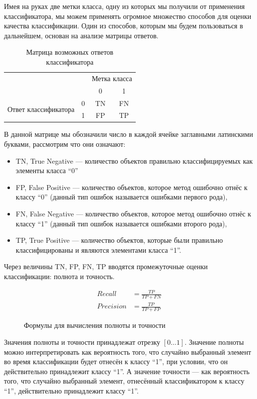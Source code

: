 Имея на руках две метки класса, одну из которых мы получили от применения классификатора, мы можем применять огромное множество способов для оценки качества классификации. Один из способов, которым мы будем пользоваться в дальнейшем, основан на анализе матрицы ответов.

\begin{table}[ht]
\caption{Матрица возможных ответов классификатора}
\label{tab_weight}
\centering
    \begin{tabular}{|c|c|c|c|}
    \hline \multicolumn{2}{|c|}{} & \multicolumn{2}{c|}{Метка класса} \\
    \cline {2-4} & & 0 & 1 \\
   	\hline \multirow{2}{*}{Ответ классификатора} &  0 & TN & FN \\
   	\cline {2-4} & 1 & FP & TP \\
    \hline
    \end{tabular}
\end{table}


В данной матрице мы обозначили число в каждой ячейке заглавными латинскими буквами, рассмотрим что они означают:
\begin{itemize}
\item  TN, True Negative — количество объектов правильно классифицируемых как элементы класса “0”
\item  FP, False Positive — количество объектов, которое метод ошибочно отнёс к классу “0” (данный тип ошибок называется ошибками первого рода),
\item  FN, False Negative — количество объектов, которое метод ошибочно отнёс к классу “1” (данный тип ошибок называется ошибками второго рода),
\item  TP, True Positive — количество объектов, которые были правильно классифицированы и являются элементами класса “1”.
\end{itemize}
Через величины TN, FP, FN, TP вводятся промежуточные оценки классификации: полнота и точность.

\begin{figure}[ht]
\begin{align}
Recall &= \frac{TP}{TP + FN} \\[0.5cm]
Precision &= \frac{TP}{TP + FP}
\end{align}
\caption{Формулы для вычисления полноты и точности}
\end{figure}

Значения полноты и точности принадлежат отрезку $[0 \dots 1]$. Значение полноты можно интерпретировать как вероятность того, что случайно выбранный элемент во время классификации будет отнесён к классу “1”, при условии, что он действительно принадлежит классу “1”. А значение точности — как вероятность того, что случайно выбранный элемент, отнесённый классификатором к классу “1”, действительно принадлежит классу “1”.

